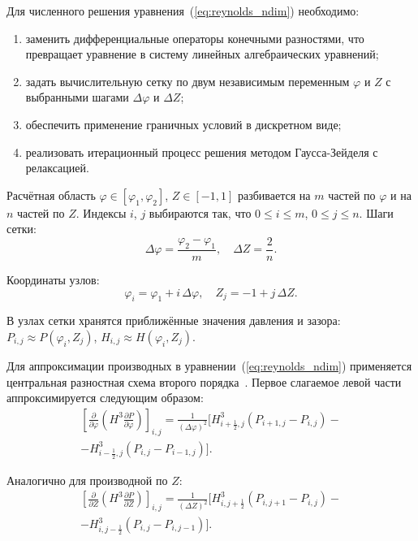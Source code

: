 Для численного решения уравнения~(\ref{eq:reynolds_ndim}) необходимо:
\begin{enumerate}
    \item заменить дифференциальные операторы конечными разностями, что превращает уравнение в систему линейных алгебраических уравнений;
    \item задать вычислительную сетку по двум независимым переменным $\varphi$ и $Z$ с выбранными шагами $\Delta\varphi$ и $\Delta Z$;
    \item обеспечить применение граничных условий в дискретном виде;
    \item реализовать итерационный процесс решения методом Гаусса-Зейделя с релаксацией.
\end{enumerate}

Расчётная область $\varphi \in [\varphi_1, \varphi_2]$, $Z \in [-1, 1]$ разбивается на $m$ частей по $\varphi$ и на $n$ частей по $Z$. Индексы $i$, $j$ выбираются так, что $0 \leq i \leq m$, $0 \leq j \leq n$. Шаги сетки:
\begin{equation}
    \Delta\varphi = \frac{\varphi_2 - \varphi_1}{m}, \quad \Delta Z = \frac{2}{n}.
    \label{eq:grid_steps}
\end{equation}

Координаты узлов:
\begin{equation}
    \varphi_i = \varphi_1 + i\,\Delta\varphi, \quad Z_j = -1 + j\,\Delta Z.
    \label{eq:grid_nodes}
\end{equation}

В узлах сетки хранятся приближённые значения давления и зазора: $P_{i,j} \approx P(\varphi_i, Z_j)$, $H_{i,j} \approx H(\varphi_i, Z_j)$.

Для аппроксимации производных в уравнении~(\ref{eq:reynolds_ndim}) применяется центральная разностная схема второго порядка~\cite{hamrock}. Первое слагаемое левой части аппроксимируется следующим образом:
\begin{equation}
    \begin{split}
    \left[\frac{\partial}{\partial\varphi}\!\left(H^3 \frac{\partial P}{\partial\varphi}\right)\right]_{i,j} = \frac{1}{(\Delta\varphi)^2}\Big[H_{i+\frac12,j}^3(P_{i+1,j} - P_{i,j}) - {} \\
    - H_{i-\frac12,j}^3(P_{i,j} - P_{i-1,j})\Big].
    \end{split}
    \label{eq:fdm_phi}
\end{equation}

Аналогично для производной по $Z$:
\begin{equation}
    \begin{split}
    \left[\frac{\partial}{\partial Z}\!\left(H^3 \frac{\partial P}{\partial Z}\right)\right]_{i,j} = \frac{1}{(\Delta Z)^2}\Big[H_{i,j+\frac12}^3(P_{i,j+1} - P_{i,j}) - {} \\
    - H_{i,j-\frac12}^3(P_{i,j} - P_{i,j-1})\Big].
    \end{split}
    \label{eq:fdm_z}
\end{equation}

